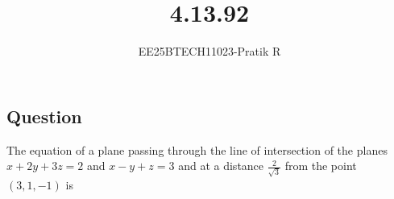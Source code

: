 \documentclass[journal]{IEEEtran}
\begin{document}

\vspace{3cm}

\title{4.13.92}
\author{EE25BTECH11023-Pratik R}
 \maketitle
{\let\newpage\relax\maketitle}

\renewcommand{\thefigure}{\theenumi}
\renewcommand{\thetable}{\theenumi}
\setlength{\intextsep}{10pt} %


\renewcommand{\thetable}{\theenumi}

\subsection*{\textbf{Question}} 
The equation of a plane passing through the line of intersection of the planes $x+2y+3z=2$ and $x-y + z = 3$ and at a distance $\frac{2}{\sqrt{3}}$ from the point $(3,1,-1)$ is 
\end{document}
